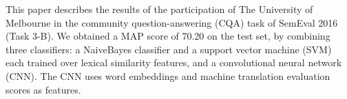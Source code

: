 This paper describes the results of the participation of The University of Melbourne in the community question-answering (CQA) task of SemEval 2016 (Task 3-B). We obtained a MAP score of 70.20 on the test set, by combining three classifiers: a NaiveBayes classifier and a support vector machine (SVM) each trained over lexical similarity features, and a convolutional neural network (CNN). The CNN uses word embeddings and machine translation evaluation scores as features.
